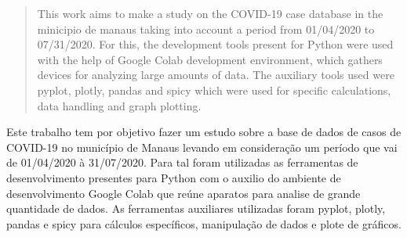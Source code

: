 \begin{abstract}
    This work aims to make a study on the COVID-19 case database in the minicipio de manaus taking into account a period from 01/04/2020 to 07/31/2020. For this, the development tools present for Python were used with the help of Google Colab development environment, which gathers devices for analyzing large amounts of data. The auxiliary tools used were pyplot, plotly, pandas and spicy which were used for specific calculations, data handling and graph plotting.
\end{abstract}
     
\begin{resumo} 
   Este trabalho tem por objetivo fazer um estudo sobre a base de dados de casos de COVID-19 no município de Manaus levando em consideração um período que vai de  01/04/2020 à 31/07/2020. Para tal foram utilizadas as ferramentas de desenvolvimento presentes para Python  com o auxilio do ambiente de desenvolvimento Google Colab que reúne aparatos para analise de grande quantidade de dados. As ferramentas auxiliares utilizadas foram pyplot, plotly, pandas e spicy para cálculos específicos, manipulação de dados e plote de gráficos.
\end{resumo}
